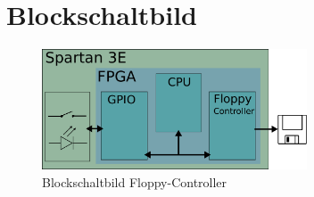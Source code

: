 \section{Blockschaltbild}
\begin{figure}[h!]
    \centering
    \includegraphics[width=0.7\textwidth]{../organization/Blockschaltbild.pdf}
    \caption{Blockschaltbild Floppy-Controller}
    \label{fig:block}
\end{figure}
